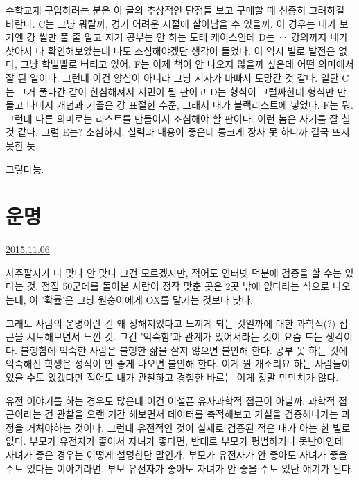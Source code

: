 수학교재 구입하려는 분은 이 글의 추상적인 단점들 보고 구매할 때 신중히 고려하길 바란다.
C는 그냥 뭐랄까, 경기 어려운 시절에 살아남을 수 있을까. 이 경우는 내가 보기엔 걍 썰만 풀 줄 알고 자기 공부는 안 하는 도태 케이스인데
D는 ‥ 강의까지 내가 찾아서 다 확인해보았는데 나도 조심해야겠단 생각이 들었다. 이 역시 별로 발전은 없다, 그냥 학벌빨로 버티고 있어.
F는 이제 책이 안 나오지 않을까 싶은데 어떤 의미에서 잘 된 일이다. 그런데 이건 양심이 아니라 그냥 저자가 바빠서 도망간 것 같다.
일단 C는 그거 풀다간 같이 한심해져서 서민이 될 판이고
D는 형식이 그럴싸한데 형식만 만들고 나머지 개념과 기출은 걍 표절한 수준, 그래서 내가 블랙리스트에 넣었다.
F는 뭐. 그런데 다른 의미로는 리스트를 만들어서 조심해야 할 판이다. 이런 놈은 사기를 잘 칠 것 같다.
그럼 E는? 소심하지. 실력과 내용이 좋은데 통크게 장사 못 하니까 결국 뜨지 못한 듯.
\vspace{5mm}

그렇다능.
\vspace{5mm}






\section{운명}
\href{https://www.kockoc.com/Apoc/465783}{2015.11.06}

\vspace{5mm}

사주팔자가 다 맞나 안 맞나 그건 모르겠지만, 적어도 인터넷 덕분에 검증을 할 수는 있다는 것.
점집 50군데를 돌아본 사람이 정작 맞춘 곳은 2곳 밖에 없다라는 식으로 나오는데, 이 '확률'은 그냥 원숭이에게 OX를 맡기는 것보다 낮다.
\vspace{5mm}

그래도 사람의 운명이란 건 왜 정해져있다고 느끼게 되는 것일까에 대한 과학적(?) 접근을 시도해보면서 느낀 것.
그건 '익숙함'과 관계가 있어서라는 것이 요즘 드는 생각이다.
불행함에 익숙한 사람은 불행한 삶을 살지 않으면 불안해 한다.
공부 못 하는 것에 익숙해진 학생은 성적이 안 좋게 나오면 불안해 한다.
이게 뭔 개소리요 하는 사람들이 있을 수도 있겠다만 적어도 내가 관찰하고 경험한 바로는 이게 정말 만만치가 않다.
\vspace{5mm}

유전 이야기를 하는 경우도 많은데 이건 어설픈 유사과학적 접근이 아닐까.
과학적 접근이라는 건 관찰을 오랜 기간 해보면서 데이터를 축적해보고 가설을 검증해나가는 과정을 거쳐야하는 것이다.
그런데 유전적인 것이 실제로 검증된 적은 내가 아는 한 별로 없다. 부모가 유전자가 좋아서 자녀가 좋다면,
반대로 부모가 평범하거나 못난이인데 자녀가 좋은 경우는 어떻게 설명한단 말인가.
부모가 유전자가 안 좋아도 자녀가 좋을 수도 있다는 이야기라면, 부모 유전자가 좋아도 자녀가 안 좋을 수도 있단 얘기가 된다.
\vspace{5mm}

